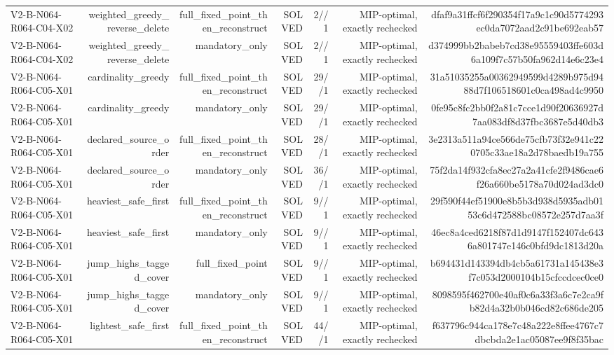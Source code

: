 {\begin{longtable}{lrrrrrr}
V2-B-N064-R064-C04-X02 & weighted\_greedy\_reverse\_delete & full\_fixed\_point\_then\_reconstruct & SOLVED & 2//1 & MIP-optimal, exactly rechecked & dfaf9a31ffcf6f290354f17a9c1c90d5774293ec0da7072aad2c91be692eab57 \\
V2-B-N064-R064-C04-X02 & weighted\_greedy\_reverse\_delete & mandatory\_only & SOLVED & 2//1 & MIP-optimal, exactly rechecked & d374999bb2babeb7cd38e95559403ffe603d6a109f7c57b50fa962d14e6c23e4 \\
V2-B-N064-R064-C05-X01 & cardinality\_greedy & full\_fixed\_point\_then\_reconstruct & SOLVED & 29//1 & MIP-optimal, exactly rechecked & 31a51035255a00362949599d4289b975d9488d7f106518601c0ca498ad4c9950 \\
V2-B-N064-R064-C05-X01 & cardinality\_greedy & mandatory\_only & SOLVED & 29//1 & MIP-optimal, exactly rechecked & 0fe95c8fc2bb0f2a81c7cce1d90f20636927d7aa083df8d37fbc3687e5d40db3 \\
V2-B-N064-R064-C05-X01 & declared\_source\_order & full\_fixed\_point\_then\_reconstruct & SOLVED & 28//1 & MIP-optimal, exactly rechecked & 3e2313a511a94ce566de75cfb73f32e941c220705c33ae18a2d78baedb19a755 \\
V2-B-N064-R064-C05-X01 & declared\_source\_order & mandatory\_only & SOLVED & 36//1 & MIP-optimal, exactly rechecked & 75f2da14f932cfa8ec27a2a41cfe2f9486cae6f26a660be5178a70d024ad3dc0 \\
V2-B-N064-R064-C05-X01 & heaviest\_safe\_first & full\_fixed\_point\_then\_reconstruct & SOLVED & 9//1 & MIP-optimal, exactly rechecked & 29f590f44ef51900e8b5b3d938d5935adb0153c6d472588bc08572e257d7aa3f \\
V2-B-N064-R064-C05-X01 & heaviest\_safe\_first & mandatory\_only & SOLVED & 9//1 & MIP-optimal, exactly rechecked & 46ec8a4ced6218f87d1d9147f152407dc6436a801747e146c0bfd9dc1813d20a \\
V2-B-N064-R064-C05-X01 & jump\_highs\_tagged\_cover & full\_fixed\_point & SOLVED & 9//1 & MIP-optimal, exactly rechecked & b694431d143394db4cb5a61731a145438e3f7c053d2000104b15cfccdcec0ce0 \\
V2-B-N064-R064-C05-X01 & jump\_highs\_tagged\_cover & mandatory\_only & SOLVED & 9//1 & MIP-optimal, exactly rechecked & 8098595f462700e40af0c6a33f3a6c7e2ca9fb82d4a32b0b046cd82c686de205 \\
V2-B-N064-R064-C05-X01 & lightest\_safe\_first & full\_fixed\_point\_then\_reconstruct & SOLVED & 44//1 & MIP-optimal, exactly rechecked & f637796c944ca178e7c48a222e8ffee4767c7dbcbda2e1ac05087ee9f8f35bac \\

\end{longtable}}
